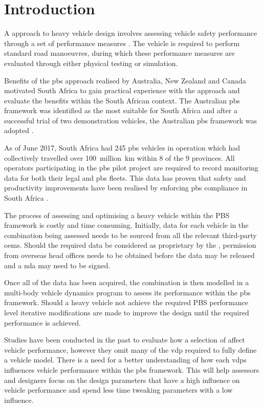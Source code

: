 \chapter{Introduction}\label{chapter:introduction}

A  approach to heavy vehicle design involves assessing vehicle safety performance through a set of performance measures \cite{Arredondo2012}. The vehicle is required to perform standard road manoeuvres, during which these performance measures are evaluated through either physical testing or simulation.

Benefits of the \gls{pbs} approach realised by Australia, New Zealand and Canada motivated South Africa to gain practical experience with the approach and evaluate the benefits within the South African context. The Australian \gls{pbs} framework was identified as the most suitable for South Africa and after a successful trial of two demonstration vehicles, the Australian \gls{pbs} framework was adopted \cite{Nordengen2014}. 

As of June 2017, South Africa had 245 \gls{pbs} vehicles in operation which had collectively travelled over 100~million~km within 8 of the 9 provinces. All operators participating in the \gls{pbs} pilot project are required to record monitoring data for both their legal and \gls{pbs} fleets. This data has proven that safety and productivity improvements have been realised by enforcing \gls{pbs} compliance in South Africa \cite{Nordengen2018}.

The process of assessing and optimising a heavy vehicle within the PBS framework is costly and time consuming. Initially, data for each vehicle in the combination being assessed needs to be sourced from all the relevant third-party \glspl{oem}. Should the required data be considered as proprietary by the , permission from overseas head offices needs to be obtained before the data may be released and a \gls{nda} may need to be signed. 

Once all of the data has been acquired, the combination is then modelled in a multi-body vehicle dynamics program to assess its performance within the \gls{pbs} framework. Should a heavy vehicle not achieve the required PBS performance level iterative modifications are made to improve the design until the required performance is achieved. 

Studies have been conducted in the past to evaluate how a selection of  affect vehicle performance, however they omit many of the \gls{vdp} required to fully define a vehicle model. There is a need for a better understanding of how each \glspl{vdp} influences vehicle performance within the \gls{pbs} framework. This will help assessors and designers focus on the design parameters that have a high influence on vehicle performance and spend less time tweaking parameters with a low influence.

